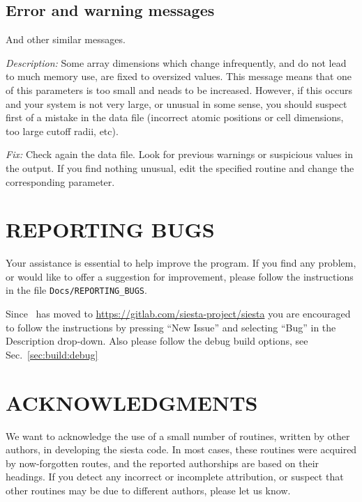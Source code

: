 \subsection{Error and warning messages}

\begin{description}
\itemsep 10pt
\parsep 0pt

\item[\texttt{chkdim: ERROR: In \textit{routine} dimension \textit{parameter} =
\textit{value}. It must be  ...}]

And other similar messages.

\textit{Description:} Some array dimensions which change infrequently,
and do not lead to much memory use, are fixed to oversized
values. This message means that one of this parameters is too small
and neads to be increased.  However, if this occurs and your system is
not very large, or unusual in some sense, you should suspect first of
a mistake in the data file (incorrect atomic positions or cell
dimensions, too large cutoff radii, etc).

\textit{Fix:} Check again the data file.  Look for previous warnings or
suspicious values in the output.  If you find nothing unusual, edit
the specified routine and change the corresponding parameter.  

\end{description}




\section{REPORTING BUGS}

Your assistance is essential to help improve the program. If you find
any problem, or would like to offer a suggestion for improvement,
please follow the instructions in the file
\texttt{Docs/REPORTING\_BUGS}. 

Since \siesta\ has moved to
\url{https://gitlab.com/siesta-project/siesta} you are encouraged to
follow the instructions by pressing ``New Issue'' and selecting
``Bug'' in the Description drop-down. Also please follow the debug
build options, see Sec.~\ref{sec:build:debug}


\section{ACKNOWLEDGMENTS}

We want to acknowledge the use of a small number of routines,
written by other authors, in developing the siesta code.
In most cases, these routines were acquired by now-forgotten
routes, and the reported authorships are based on their headings.
If you detect any incorrect or incomplete attribution, or suspect
that other routines may be due to different authors, please
let us know.

